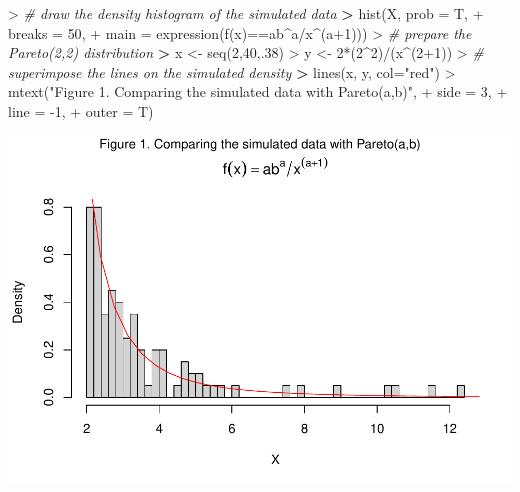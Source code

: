 \documentclass[
]{article}
\newenvironment{Shaded}{\begin{snugshade}}{\end{snugshade}}
\newcommand{\AttributeTok}[1]{\textcolor[rgb]{0.77,0.63,0.00}{#1}}
\newcommand{\CommentTok}[1]{\textcolor[rgb]{0.56,0.35,0.01}{\textit{#1}}}
\newcommand{\DecValTok}[1]{\textcolor[rgb]{0.00,0.00,0.81}{#1}}
\newcommand{\ErrorTok}[1]{\textcolor[rgb]{0.64,0.00,0.00}{\textbf{#1}}}
\newcommand{\FunctionTok}[1]{\textcolor[rgb]{0.00,0.00,0.00}{#1}}
\newcommand{\NormalTok}[1]{#1}
\newcommand{\OtherTok}[1]{\textcolor[rgb]{0.56,0.35,0.01}{#1}}
\newcommand{\SpecialCharTok}[1]{\textcolor[rgb]{0.00,0.00,0.00}{#1}}
\newcommand{\StringTok}[1]{\textcolor[rgb]{0.31,0.60,0.02}{#1}}
\begin{document}
\begin{Shaded}
\begin{Highlighting}[]
\SpecialCharTok{\textgreater{}} \CommentTok{\# draw the density histogram of the simulated data}
\ErrorTok{\textgreater{}} \FunctionTok{hist}\NormalTok{(X, }\AttributeTok{prob =}\NormalTok{ T, }
\SpecialCharTok{+}      \AttributeTok{breaks =} \DecValTok{50}\NormalTok{, }
\SpecialCharTok{+}      \AttributeTok{main =} \FunctionTok{expression}\NormalTok{(}\FunctionTok{f}\NormalTok{(x)}\SpecialCharTok{==}\NormalTok{ab}\SpecialCharTok{\^{}}\NormalTok{a}\SpecialCharTok{/}\NormalTok{x}\SpecialCharTok{\^{}}\NormalTok{(a}\SpecialCharTok{+}\DecValTok{1}\NormalTok{))) }
\SpecialCharTok{\textgreater{}} \CommentTok{\# prepare the Pareto(2,2) distribution}
\ErrorTok{\textgreater{}}\NormalTok{ x }\OtherTok{\textless{}{-}} \FunctionTok{seq}\NormalTok{(}\DecValTok{2}\NormalTok{,}\DecValTok{40}\NormalTok{,.}\DecValTok{38}\NormalTok{)}
\SpecialCharTok{\textgreater{}}\NormalTok{ y }\OtherTok{\textless{}{-}} \DecValTok{2}\SpecialCharTok{*}\NormalTok{(}\DecValTok{2}\SpecialCharTok{\^{}}\DecValTok{2}\NormalTok{)}\SpecialCharTok{/}\NormalTok{(x}\SpecialCharTok{\^{}}\NormalTok{(}\DecValTok{2}\SpecialCharTok{+}\DecValTok{1}\NormalTok{))}
\SpecialCharTok{\textgreater{}} \CommentTok{\# superimpose the lines on the simulated density}
\ErrorTok{\textgreater{}} \FunctionTok{lines}\NormalTok{(x, y, }\AttributeTok{col=}\StringTok{"red"}\NormalTok{)}
\SpecialCharTok{\textgreater{}} \FunctionTok{mtext}\NormalTok{(}\StringTok{"Figure 1. Comparing the simulated data with Pareto(a,b)"}\NormalTok{,}
\SpecialCharTok{+}       \AttributeTok{side =} \DecValTok{3}\NormalTok{,}
\SpecialCharTok{+}       \AttributeTok{line =} \SpecialCharTok{{-}}\DecValTok{1}\NormalTok{,}
\SpecialCharTok{+}       \AttributeTok{outer =}\NormalTok{ T)}
\end{Highlighting}
\end{Shaded}

\includegraphics[width=1\linewidth,height=0.4\textheight]{HW_02_Chenguang_Pan_files/figure-latex/unnamed-chunk-2-1}
\end{document}
